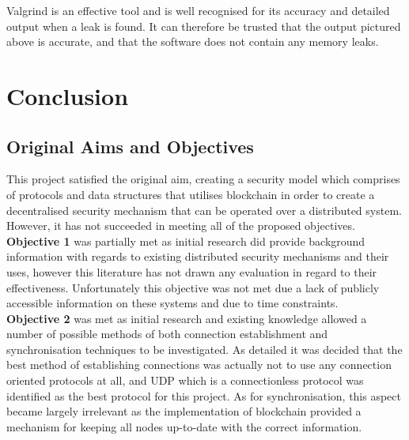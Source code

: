 \documentclass[a4paper, 11pt]{report}
\begin{document}
Valgrind is an effective tool and is well recognised for its accuracy and detailed output when a leak is found. It can therefore be trusted that the output pictured above is accurate, and that the software does not contain any memory leaks.

\chapter{Conclusion}


\section{Original Aims and Objectives}
This project satisfied the original aim, creating a security model which comprises of protocols and data structures that utilises blockchain in order to create a decentralised security mechanism that can be operated over a distributed system. However, it has not succeeded in meeting all of the proposed objectives.\\


\textbf{Objective 1} was partially met as initial research did provide background information with regards to existing distributed security mechanisms and their uses, however this literature has not drawn any evaluation in regard to their effectiveness. Unfortunately this objective was not met due a lack of publicly accessible information on these systems and due to time constraints.\\

\textbf{Objective 2} was met as initial research and existing knowledge allowed a number of possible methods of both connection establishment and synchronisation techniques to be investigated. As detailed it was decided that the best method of establishing connections was actually not to use any connection oriented protocols at all, and \acrshort{UDP} which is a connectionless protocol was identified as the best protocol for this project. As for synchronisation, this aspect became largely irrelevant as the implementation of blockchain provided a mechanism for keeping all nodes up-to-date with the correct information.\\
\end{document}
